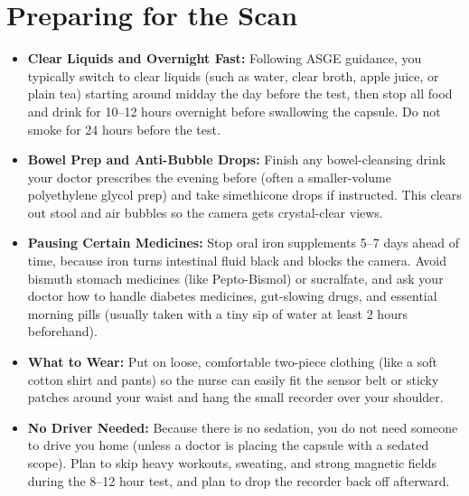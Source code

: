 \section{Preparing for the Scan}
\begin{itemize}
    \item \textbf{Clear Liquids and Overnight Fast:} Following ASGE guidance, you typically switch to clear liquids (such as water, clear broth, apple juice, or plain tea) starting around midday the day before the test, then stop all food and drink for 10--12 hours overnight before swallowing the capsule. Do not smoke for 24 hours before the test.
    \item \textbf{Bowel Prep and Anti-Bubble Drops:} Finish any bowel-cleansing drink your doctor prescribes the evening before (often a smaller-volume polyethylene glycol prep) and take simethicone drops if instructed. This clears out stool and air bubbles so the camera gets crystal-clear views.
    \item \textbf{Pausing Certain Medicines:} Stop oral iron supplements 5--7 days ahead of time, because iron turns intestinal fluid black and blocks the camera. Avoid bismuth stomach medicines (like Pepto-Bismol) or sucralfate, and ask your doctor how to handle diabetes medicines, gut-slowing drugs, and essential morning pills (usually taken with a tiny sip of water at least 2 hours beforehand).
    \item \textbf{What to Wear:} Put on loose, comfortable two-piece clothing (like a soft cotton shirt and pants) so the nurse can easily fit the sensor belt or sticky patches around your waist and hang the small recorder over your shoulder.
    \item \textbf{No Driver Needed:} Because there is no sedation, you do not need someone to drive you home (unless a doctor is placing the capsule with a sedated scope). Plan to skip heavy workouts, sweating, and strong magnetic fields during the 8--12 hour test, and plan to drop the recorder back off afterward.
\end{itemize}

